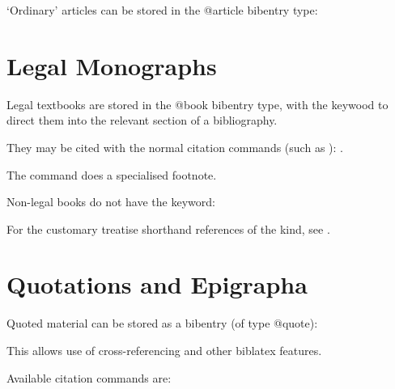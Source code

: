 \p `Ordinary' articles can be stored in the @article bibentry type: \begin{quotation}\noindent{}\end{quotation}

\section{Legal Monographs}

\p Legal textbooks are stored in the @book bibentry type, with the keywood  to direct them into the relevant section of a bibliography.

\p They may be cited with the normal citation commands (such as ): \cite{lrcns}.

\p The  command does a specialised footnote.

\p Non-legal books do not have the keyword: \cite{litlaw}

\p For the customary treatise shorthand references of the  kind, see .%


\section{Quotations and Epigrapha}
\label{sec:epigrapha}

\bigskip
\p Quoted material can be stored as a bibentry (of type @quote):

This allows use of cross-referencing and other biblatex features.

\p Available citation commands are:

